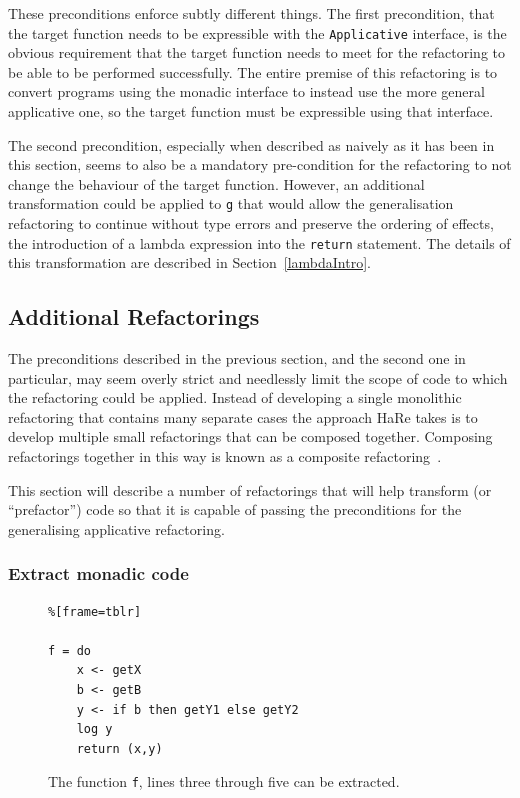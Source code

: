 These preconditions enforce subtly different things. The first precondition, that the target function needs to be expressible with the \texttt{Applicative} interface, is the obvious requirement that the target function needs to meet for the refactoring to be able to be performed successfully. The entire premise of this refactoring is to convert programs using the monadic interface to instead use the more general applicative one, so the target function must be expressible using that interface.

The second precondition, especially when described as naively as it has been in this section, seems to also be a mandatory pre-condition for the refactoring to not change the behaviour of the target function. However, an additional transformation could be applied to \texttt{g} that would allow the generalisation refactoring to continue without type errors and preserve the ordering of effects, the introduction of a lambda expression into the \texttt{return} statement. The details of this transformation are described in Section~\ref{lambdaIntro}.  


\subsection{Additional Refactorings}
\label{sec:otherRefs}
The preconditions described in the previous section, and the second one in particular, may seem overly strict and needlessly limit the scope of code to which the refactoring could be applied. Instead of developing a single monolithic refactoring that contains many separate cases the approach HaRe takes is to develop multiple small refactorings that can be composed together. Composing refactorings together in this way is known as a composite refactoring~\citep{wranglerDomain}.

This section will describe a number of refactorings that will help transform (or ``prefactor'') code so that it is capable of passing the preconditions for the generalising applicative refactoring. 

\subsubsection{Extract monadic code}
\label{subSec:extract}

\begin{figure}[t]
\begin{lstlisting}%[frame=tblr]

f = do
	x <- getX
	b <- getB
	y <- if b then getY1 else getY2
	log y
	return (x,y)	
\end{lstlisting}
\caption{The function \texttt{f}, lines three through five can be extracted.}
\label{fMonad}
\end{figure}



